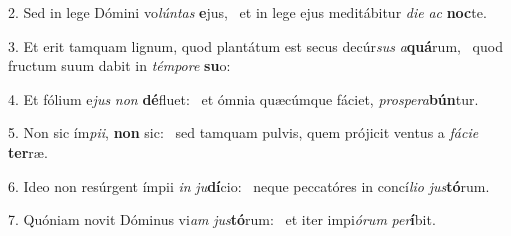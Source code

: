 2. Sed in lege Dómini vo\textit{lún}\textit{tas} \textbf{e}jus, \ast\  et in lege ejus meditábitur \textit{di}\textit{e} \textit{ac} \textbf{noc}te.\

3. Et erit tamquam lignum, quod plantátum est secus decúr\textit{sus} \textit{a}\textbf{quá}rum, \ast\  quod fructum suum dabit in \textit{tém}\textit{po}\textit{re} \textbf{su}o:\

4. Et fólium e\textit{jus} \textit{non} \textbf{dé}fluet: \ast\  et ómnia quæcúmque fáciet, \textit{pro}\textit{spe}\textit{ra}\textbf{bún}tur.\

5. Non sic ím\textit{pi}\textit{i}, \textbf{non} sic: \ast\  sed tamquam pulvis, quem prójicit ventus a \textit{fá}\textit{ci}\textit{e} \textbf{ter}ræ.\

6. Ideo non resúrgent ímpii \textit{in} \textit{ju}\textbf{dí}cio: \ast\  neque peccatóres in concí\textit{li}\textit{o} \textit{jus}\textbf{tó}rum.\

7. Quóniam novit Dóminus vi\textit{am} \textit{jus}\textbf{tó}rum: \ast\  et iter impi\textit{ó}\textit{rum} \textit{per}\textbf{í}bit.\

